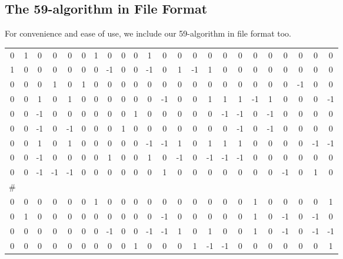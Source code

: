 \documentclass{article}
\begin{document}




\newpage

\begin{appendix}


\section{The 59-algorithm in File Format}
    For convenience and ease of use, we include our 59-algorithm in file format too.

\begin{table}[ht!]
\begin{adjustbox}{max width=.99\textwidth}
    \begin{tabular}{ccccc ccccc ccccc ccccc ccc}
    \setlength{\tabcolsep}{6pt}
         0 & 1 & 0 & 0 & 0 & 0 & 1 & 0 & 0 & 0 & 1 & 0 & 0 & 0 & 0 & 0 & 0 & 0 & 0 & 0 & 0 & 0 & 0\\
1 & 0 & 0 & 0 & 0 & 0 & 0 & -1 & 0 & 0 & -1 & 0 & 1 & -1 & 1 & 0 & 0 & 0 & 0 & 0 & 0 & 0 & 0\\
0 & 0 & 0 & 1 & 0 & 1 & 0 & 0 & 0 & 0 & 0 & 0 & 0 & 0 & 0 & 0 & 0 & 0 & 0 & 0 & -1 & 0 & 0\\
0 & 0 & 1 & 0 & 1 & 0 & 0 & 0 & 0 & 0 & 0 & -1 & 0 & 0 & 1 & 1 & 1 & -1 & 1 & 0 & 0 & 0 & -1\\
0 & 0 & -1 & 0 & 0 & 0 & 0 & 0 & 0 & 1 & 0 & 0 & 0 & 0 & 0 & -1 & -1 & 0 & -1 & 0 & 0 & 0 & 0\\
0 & 0 & -1 & 0 & -1 & 0 & 0 & 0 & 1 & 0 & 0 & 0 & 0 & 0 & 0 & 0 & -1 & 0 & -1 & 0 & 0 & 0 & 0\\
0 & 0 & 1 & 0 & 1 & 0 & 0 & 0 & 0 & 0 & -1 & -1 & 1 & 0 & 1 & 1 & 1 & 0 & 0 & 0 & 0 & -1 & -1\\
0 & 0 & -1 & 0 & 0 & 0 & 0 & 1 & 0 & 0 & 1 & 0 & -1 & 0 & -1 & -1 & -1 & 0 & 0 & 0 & 0 & 0 & 0\\
0 & 0 & -1 & -1 & -1 & 0 & 0 & 0 & 0 & 0 & 0 & 1 & 0 & 0 & 0 & 0 & 0 & 0 & 0 & -1 & 0 & 1 & 0\\
\#\\
0 & 0 & 0 & 0 & 0 & 0 & 1 & 0 & 0 & 0 & 0 & 0 & 0 & 0 & 0 & 0 & 0 & 1 & 0 & 0 & 0 & 0 & 1\\
0 & 1 & 0 & 0 & 0 & 0 & 0 & 0 & 0 & 0 & 0 & -1 & 0 & 0 & 0 & 0 & 0 & 1 & 0 & -1 & 0 & -1 & 0\\
0 & 0 & 0 & 0 & 0 & 0 & 0 & -1 & 0 & 0 & -1 & -1 & 1 & 0 & 1 & 0 & 0 & 1 & 0 & -1 & 0 & -1 & -1\\
0 & 0 & 0 & 0 & 0 & 0 & 0 & 0 & 0 & 1 & 0 & 0 & 0 & 1 & -1 & -1 & 0 & 0 & 0 & 0 & 0 & 0 & 1\\

\end{tabular}
\end{adjustbox}
\end{table}
\end{appendix}
\end{document}
